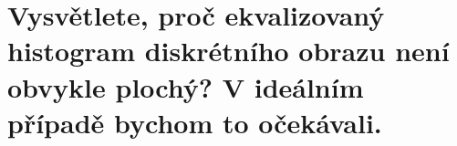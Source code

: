 \section{Vysvětlete, proč ekvalizovaný histogram diskrétního obrazu není obvykle plochý? V ideálním případě bychom to 
očekávali.}